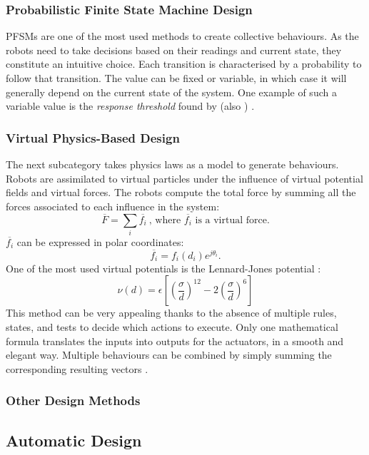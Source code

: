 \documentclass[a4paper, 12pt]{report}
\begin{document}
			\subsubsection{Probabilistic Finite State Machine Design}
			
			PFSMs \citep{minsky1967computation} are one of the most used methods to create collective behaviours. As the robots need to take decisions based on their readings and current state, they constitute an intuitive choice. Each transition is characterised by a probability to follow that transition. The value can be fixed or variable, in which case it will generally depend on the current state of the system. One example of such a variable value is the \emph{response threshold} found by \citet{granovetter1978threshold} (also \citet{bonabeau1997adaptive}) .
			
			\subsubsection{Virtual Physics-Based Design}
			
			The next subcategory takes physics laws as a model to generate behaviours. Robots are assimilated to virtual particles under the influence of virtual potential fields and virtual forces. The robots compute the total force by summing all the forces associated to each influence in the system:
			$$\overline{F} = \sum_{i}{\overline{f_i}} ~\mbox{, where $\overline{f_i}$ is a virtual force.}$$
			$\overline{f_i}$ can be expressed in polar coordinates: $$\overline{f_i} = f_i(d_i)e^{j\theta_i}.$$ 
			One of the most used virtual potentials is the Lennard-Jones potential : 
			$$ \nu(d) = \epsilon \left[ \left(\frac{\sigma}{d}\right)^{12} - 2 \left(\frac{\sigma}{d}\right)^6 \right]$$
			This method can be very appealing thanks to the absence of multiple rules, states, and tests to decide which actions to execute. Only one mathematical formula translates the inputs into outputs for the actuators, in a smooth and elegant way. Multiple behaviours can be combined by simply summing the corresponding resulting vectors \citep{brambilla2013swarm}.
			
			\subsubsection{Other Design Methods}
		
		
		
		\subsection{Automatic Design}
\end{document}
